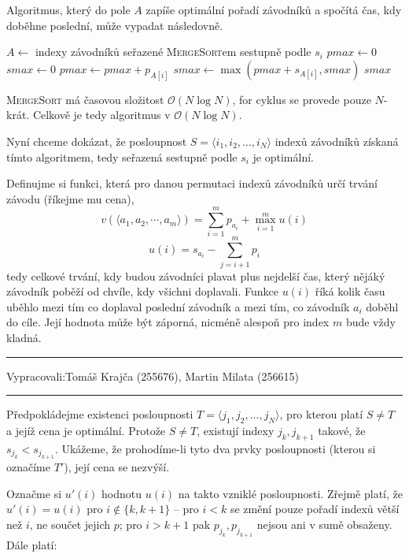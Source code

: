 \documentclass[12pt]{article}
\newcommand{\la}{\leftarrow}
\renewcommand{\O}{\mathcal{O}}
\newcommand{\zadani}[2]{
{\large
\noindent {\bf IB108 \hfill{} Sada #1, Příklad #2 \\[-4mm]}
\noindent\hrule
\vspace{2mm}
\noindent Vypracovali:\hfill{}Tomáš Krajča (255676), Martin Milata (256615)
\vspace{3mm}
\hrule
\bigskip\bigskip}
}
\begin{document}
Algoritmus, který do pole $A$ zapíše optimální pořadí závodníků a spočítá čas, kdy doběhne poslední,
může vypadat následovně.

\begin{algorithm}
\begin{algorithmic}
\STATE $A \la$ indexy závodníků seřazené \textsc{MergeSort}em sestupně podle $s_i$
\STATE $pmax \la 0$
\STATE $smax \la 0$
\FOR{$i \la 1 $ to $N$}
\STATE $pmax \la pmax + p_{A[i]}$
\STATE $smax \la \max(pmax+s_{A[i]},smax)$
\ENDFOR
\RETURN $smax$
\end{algorithmic}
\end{algorithm}

\noindent
\textsc{MergeSort} má časovou složitost $\O(N\log N)$, for cyklus se provede pouze $N$-krát.
Celkově je tedy algoritmus v $\O(N\log N)$.

\bigskip

\noindent
Nyní chceme dokázat, že posloupnost $S = \langle i_1,i_2,...,i_N \rangle$ indexů závodníků získaná tímto
algoritmem, tedy seřazená sestupně podle $s_i$ je optimální.

Definujme si funkci, která pro danou permutaci indexů závodníků určí trvání závodu (říkejme mu cena),
$$ v(\langle a_1,a_2,\cdots,a_m \rangle) = \sum_{i=1}^m p_{a_i} + \max_{i=1}^m u(i)$$
$$ u(i) = s_{a_i} - \sum_{j=i+1}^m p_i$$
tedy celkové trvání, kdy budou závodníci plavat plus nejdelší čas, který nějáký závodník poběží od
chvíle, kdy všichni doplavali. Funkce $u(i)$ říká kolik času uběhlo mezi tím co doplaval poslední
závodník a mezi tím, co závodník $a_i$ doběhl do cíle. Její hodnota může být záporná, nicméně
alespoň pro index $m$ bude vždy kladná.

\clearpage
\zadani{2}{2}

\noindent
Předpokládejme existenci posloupnosti $T = \langle j_1,j_2,...,j_N \rangle$, pro kterou platí $S
\neq T$ a jejíž cena je optimální. Protože $S \neq T$, existují indexy $j_k, j_{k+1}$ takové, že
$s_{j_k} < s_{j_{k+1}}$. Ukážeme, že prohodíme-li tyto dva prvky posloupnosti (kterou si označíme
$T'$), její cena se nezvýší.

Označme si $u'(i)$ hodnotu $u(i)$ na takto vzniklé posloupnosti. Zřejmě platí, že $u'(i) = u(i)$ pro
$i \notin \{k, k+1\}$ -- pro $i < k$ se změní pouze pořadí indexů větší než $i$, ne součet jejich
$p$; pro $i > k+1$ pak $p_{j_k}, p_{j_{k+1}}$ nejsou ani v sumě obsaženy. Dále platí:
\end{document}
